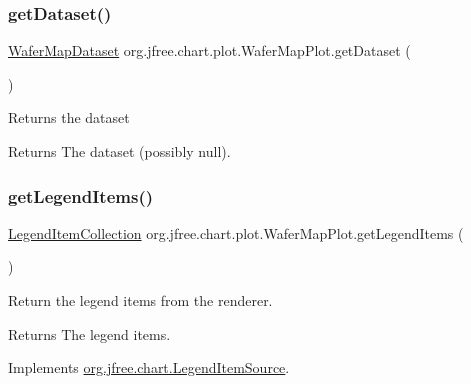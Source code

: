 \subsubsection{\texorpdfstring{get\+Dataset()}{getDataset()}}
{\footnotesize\ttfamily \mbox{\hyperlink{classorg_1_1jfree_1_1data_1_1general_1_1_wafer_map_dataset}{Wafer\+Map\+Dataset}} org.\+jfree.\+chart.\+plot.\+Wafer\+Map\+Plot.\+get\+Dataset (\begin{DoxyParamCaption}{ }\end{DoxyParamCaption})}

Returns the dataset

\begin{DoxyReturn}{Returns}
The dataset (possibly {\ttfamily null}). 
\end{DoxyReturn}
\mbox{\label{classorg_1_1jfree_1_1chart_1_1plot_1_1_wafer_map_plot_a508d6ef7b05f37d308ab9ea5d3e5b84c}} 
\subsubsection{\texorpdfstring{get\+Legend\+Items()}{getLegendItems()}}
{\footnotesize\ttfamily \mbox{\hyperlink{classorg_1_1jfree_1_1chart_1_1_legend_item_collection}{Legend\+Item\+Collection}} org.\+jfree.\+chart.\+plot.\+Wafer\+Map\+Plot.\+get\+Legend\+Items (\begin{DoxyParamCaption}{ }\end{DoxyParamCaption})}

Return the legend items from the renderer.

\begin{DoxyReturn}{Returns}
The legend items. 
\end{DoxyReturn}


Implements \mbox{\hyperlink{interfaceorg_1_1jfree_1_1chart_1_1_legend_item_source_a224409463c4f7a8ef0e2a9df337e6d3b}{org.\+jfree.\+chart.\+Legend\+Item\+Source}}.

\mbox{\label{classorg_1_1jfree_1_1chart_1_1plot_1_1_wafer_map_plot_a1f1f8e96b4b5ba8b0eae2109415ee646}} 
